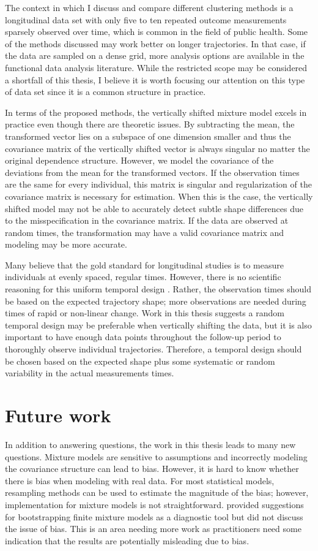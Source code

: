 The context in which I discuss and compare different clustering methods is a longitudinal data set with only five to ten repeated outcome measurements sparsely observed over time, which is common in the field of public health. Some of the methods discussed may work better on longer trajectories. In that case, if the data are sampled on a dense grid, more analysis options are available in the functional data analysis literature. While the restricted scope may be considered a shortfall of this thesis, I believe it is worth focusing our attention on this type of data set since it is a common structure in practice.

In terms of the proposed methods, the vertically shifted mixture model excels in practice even though there are theoretic issues. By subtracting the mean, the transformed vector lies on a subspace of one dimension smaller and thus the covariance matrix of the vertically shifted vector is always singular no matter the original dependence structure. However, we model the covariance of the deviations from the mean for the transformed vectors. If the observation times are the same for every individual, this matrix is singular and regularization of the covariance matrix is necessary for estimation. When this is the case, the vertically shifted model may not be able to accurately detect subtle shape differences due to the misspecification in the covariance matrix. If the data are observed at random times, the transformation may have a valid covariance matrix and modeling may be more accurate. 

Many believe that the gold standard for longitudinal studies is to measure individuals at evenly spaced, regular times. However, there is no scientific reasoning for this uniform temporal design \cite{collins2006}. Rather, the observation times should be based on the expected trajectory shape; more observations are needed during times of rapid or non-linear change. Work in this thesis suggests a random temporal design may be preferable when vertically shifting the data, but it is also important to have enough data points throughout the follow-up period to thoroughly observe individual trajectories. Therefore, a temporal design should be chosen based on the expected shape plus some systematic or random variability in the actual measurements times. 

\section{Future work}
In addition to answering questions, the work in this thesis leads to many new questions. Mixture models are sensitive to assumptions and incorrectly modeling the covariance structure can lead to bias. However, it is hard to know whether there is bias when modeling with real data. For most statistical models, resampling methods can be used to estimate the magnitude of the bias; however, implementation for mixture models is not straightforward. \Textcite{grun2004} provided suggestions for bootstrapping finite mixture models as a diagnostic tool but did not discuss the issue of bias. This is an area needing more work as practitioners need some indication that the results are potentially misleading due to bias. 

